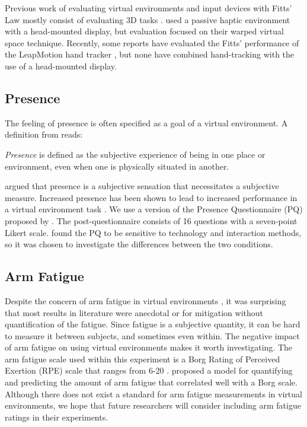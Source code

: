 Previous work of evaluating virtual environments and input devices with Fitts’ Law mostly consist of evaluating 3D tasks \citep{chun_evaluating_2004,liu_comparing_2009,teather_evaluating_2010}.
\citet{kohli_redirected_2012} used a passive haptic environment with a head-mounted display, but evaluation focused on their warped virtual space technique.
Recently, some reports have evaluated the Fitts’ performance of the LeapMotion hand tracker \citep{coelho_pointing_2014,seixas_one_2015}, but none have combined hand-tracking with the use of a head-mounted display.

\subsection{Presence}

The feeling of presence is often specified as a goal of a virtual environment.
A definition from \citet{witmer_measuring_1998} reads:
\begin{displayquote}
\textit{Presence} is defined as the subjective experience of being in one place or environment, even when one is physically situated in another.
\end{displayquote}
\citet{sheridan_musings_1992} argued that presence is a subjective sensation that necessitates a subjective measure.
Increased presence has been shown to lead to increased performance in a virtual environment task \citep{youngblut_relationship_2003}.
We use a version of the Presence Questionnaire (PQ) proposed by \citet{witmer_measuring_1998}.
The post-questionnaire consists of 16 questions with a seven-point Likert scale.
\citet{nystad_comparison_2004} found the PQ to be sensitive to technology and interaction methods, so it was chosen to investigate the differences between the two conditions.

\subsection{Arm Fatigue}

Despite the concern of arm fatigue in virtual environments \citep{burdea_virtual_2003}, it was surprising that most results in literature were anecdotal or for mitigation without quantification of the fatigue.
Since fatigue is a subjective quantity, it can be hard to measure it between subjects, and sometimes even within.
The negative impact of arm fatigue on using virtual environments makes it worth investigating.
The arm fatigue scale used within this experiment is a Borg Rating of Perceived Exertion (RPE) scale that ranges from 6-20 \citep{borg_borgs_1998}.
\citet{hincapie-ramos_consumed_2014} proposed a model for quantifying and predicting the amount of arm fatigue that correlated well with a Borg scale.
Although there does not exist a standard for arm fatigue measurements in virtual environments, we hope that future researchers will consider including arm fatigue ratings in their experiments.

